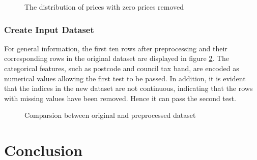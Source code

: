 \documentclass[12pt,twoside]{report}
\begin{document}
\begin{figure}[h]
	\centering
	\caption{The distribution of prices with zero prices removed}
	\label{price_removed}
\end{figure}

\subsection{Create Input Dataset}
For general information, the first ten rows after preprocessing and their corresponding rows in the original dataset are displayed in figure \ref{general_info}. The categorical features, such as postcode and council tax band, are encoded as numerical values allowing the first test to be passed. In addition, it is evident that the indices in the new dataset are not continuous, indicating that the rows with missing values have been removed. Hence it can pass the second test. 
\begin{figure}[h]
	\centering
	\caption{Comparsion between original and preprocessed dataset}
	\label{general_info}
\end{figure}

\chapter{Conclusion}




\end{document}
